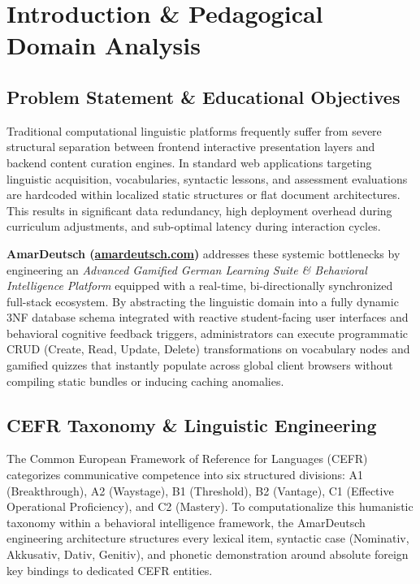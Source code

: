 \documentclass[12pt,a4paper]{article}
\begin{document}
\vspace{0.5cm}

\section{Introduction \& Pedagogical Domain Analysis}

\subsection{Problem Statement \& Educational Objectives}
Traditional computational linguistic platforms frequently suffer from severe structural separation between frontend interactive presentation layers and backend content curation engines. In standard web applications targeting linguistic acquisition, vocabularies, syntactic lessons, and assessment evaluations are hardcoded within localized static structures or flat document architectures. This results in significant data redundancy, high deployment overhead during curriculum adjustments, and sub-optimal latency during interaction cycles.

\textbf{AmarDeutsch (\url{amardeutsch.com})} addresses these systemic bottlenecks by engineering an \textit{Advanced Gamified German Learning Suite \& Behavioral Intelligence Platform} equipped with a real-time, bi-directionally synchronized full-stack ecosystem. By abstracting the linguistic domain into a fully dynamic 3NF database schema integrated with reactive student-facing user interfaces and behavioral cognitive feedback triggers, administrators can execute programmatic CRUD (Create, Read, Update, Delete) transformations on vocabulary nodes and gamified quizzes that instantly populate across global client browsers without compiling static bundles or inducing caching anomalies.

\subsection{CEFR Taxonomy \& Linguistic Engineering}
The Common European Framework of Reference for Languages (CEFR) categorizes communicative competence into six structured divisions: A1 (Breakthrough), A2 (Waystage), B1 (Threshold), B2 (Vantage), C1 (Effective Operational Proficiency), and C2 (Mastery). To computationalize this humanistic taxonomy within a behavioral intelligence framework, the AmarDeutsch engineering architecture structures every lexical item, syntactic case (Nominativ, Akkusativ, Dativ, Genitiv), and phonetic demonstration around absolute foreign key bindings to dedicated CEFR entities.
\end{document}
